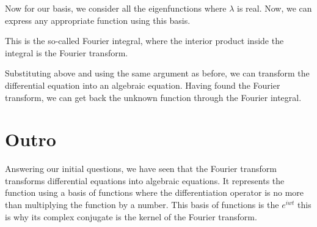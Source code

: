 \documentclass{article}
\begin{document}
Now for our basis, we consider all the eigenfunctions where $\lambda$ is real.
Now, we can express any appropriate function using this basis.

This is the so-called Fourier integral, where the interior product inside the integral is the Fourier transform.

Substituting above and using the same argument as before, we can transform the differential equation into an algebraic equation.
Having found the Fourier transform, we can get back the unknown function through the Fourier integral.

\section{Outro}

Answering our initial questions, we have seen that the Fourier transform transforms differential equations into algebraic equations. It represents the function using a basis of functions where the differentiation operator is no more than multiplying the function by a number.
This basis of functions is the $e^{iwt}$ this is why its complex conjugate is the kernel of the Fourier transform.
\end{document}
